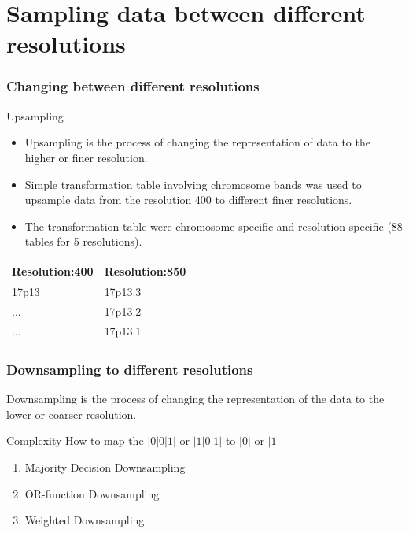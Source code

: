 \documentclass[dvips]{beamer}
\begin{document}
\section[Sampling Resolutions]{Sampling data between different resolutions}

\begin{frame}
 \frametitle {Changing between different resolutions}
 \begin{block}{Upsampling}
 \begin{itemize}
 \item Upsampling is the process of changing the representation of data to the higher or finer resolution.
 \item Simple transformation table involving chromosome bands was used to upsample data from the resolution 400 to different finer resolutions.
 \item The transformation table were chromosome specific and resolution specific (88 tables for 5 resolutions).
 \end{itemize}
 \end{block}

\begin{table}[h!]
  \centering
  \begin{tabular}{|p{2.7cm}|p{2.7cm}|p{2.7cm}|}
    \hline
    \textbf{Resolution:400} & \textbf{Resolution:850}  \\
    \hline
    17p13	& 17p13.3 \\ \hline
    ...		& 17p13.2 \\ \hline
    ...		& 17p13.1 \\ \hline
    \end{tabular} 
\end{table}
\end{frame}


\begin{frame}
 \frametitle{Downsampling to different resolutions}
Downsampling is the process of changing the representation of the data to the lower or coarser resolution.
 \begin{block}{Complexity}
  How to map the $|0|0|1|$ or $|1|0|1|$ to $|0|$ or $|1|$
 \end{block}

\begin{enumerate}
  \item Majority Decision Downsampling
  \item OR-function Downsampling
  \item Weighted Downsampling
 \end{enumerate}
\end{frame}
\end{document}
